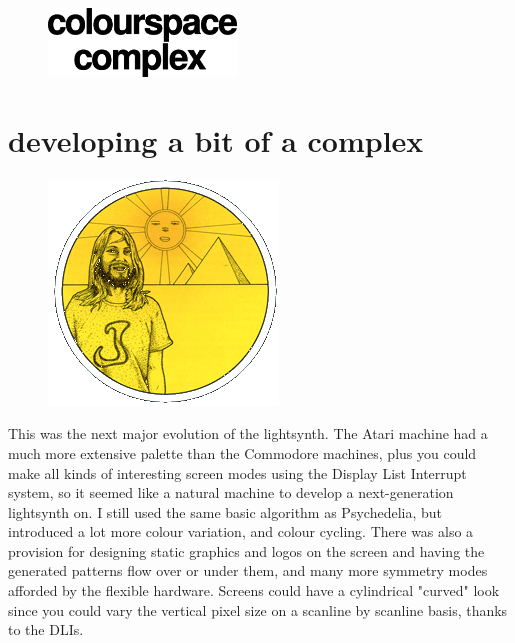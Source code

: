 \clearpage
\vspace*{\fill}
\begin{figure}[H]
    \centering
      \includegraphics[width=5cm]{src/cover/title_page_colorspace.png}%
\end{figure}
\vspace*{\fill}
\thispagestyle{empty}%
\clearpage

\chapter{developing a bit of a complex}
\begin{definition}
\setlength{\intextsep}{0pt}%
\setlength{\columnsep}{3pt}%
\begin{figure}
\includegraphics[width=\linewidth]{src/callout/psych.png} 
\end{figure}
\small
This was the next major evolution of the lightsynth. The Atari machine had a
  much more extensive palette than the Commodore machines, plus you could make
  all kinds of interesting screen modes using the Display List Interrupt
  system, so it seemed like a natural machine to develop a next-generation
  lightsynth on. I still used the same basic algorithm as Psychedelia, but
  introduced a lot more colour variation, and colour cycling. There was also a
  provision for designing static graphics and logos on the screen and having
  the generated patterns flow over or under them, and many more symmetry modes
  afforded by the flexible hardware. Screens could have a cylindrical "curved"
  look since you could vary the vertical pixel size on a scanline by scanline
  basis, thanks to the DLIs.
\end{definition}
